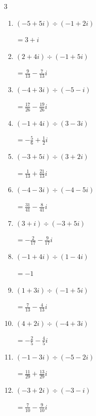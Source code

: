 \begin{multicols}{3}
\begin{enumerate}
  \item $\displaystyle (-5+5i)\div(-1+2i)$

        $\displaystyle =3+i$

  \item $\displaystyle (2+4i)\div(-1+5i)$

        $\displaystyle =\frac{9}{13}-\frac{7}{13}i$

  \item $\displaystyle (-4+3i)\div(-5-i)$

        $\displaystyle =\frac{17}{26}-\frac{19}{26}i$

  \item $\displaystyle (-1+4i)\div(3-3i)$

        $\displaystyle =-\frac{5}{6}+\frac{1}{2}i$

  \item $\displaystyle (-3+5i)\div(3+2i)$

        $\displaystyle =\frac{1}{13}+\frac{21}{13}i$

  \item $\displaystyle (-4-3i)\div(-4-5i)$

        $\displaystyle =\frac{31}{41}-\frac{8}{41}i$

  \item $\displaystyle (3+i)\div(-3+5i)$

        $\displaystyle =-\frac{2}{17}-\frac{9}{17}i$

  \item $\displaystyle (-1+4i)\div(1-4i)$

        $\displaystyle =-1$

  \item $\displaystyle (1+3i)\div(-1+5i)$

        $\displaystyle =\frac{7}{13}-\frac{4}{13}i$

\columnbreak %

  \item $\displaystyle (4+2i)\div(-4+3i)$

        $\displaystyle =-\frac{2}{5}-\frac{4}{5}i$

  \item $\displaystyle (-1-3i)\div(-5-2i)$

        $\displaystyle =\frac{11}{29}+\frac{13}{29}i$

  \item $\displaystyle (-3+2i)\div(-3-i)$

        $\displaystyle =\frac{7}{10}-\frac{9}{10}i$


\end{enumerate}
\end{multicols}
